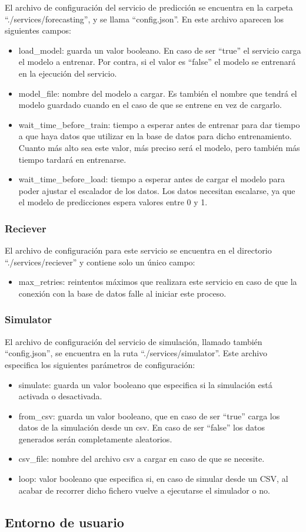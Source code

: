 El archivo de configuración del servicio de predicción se encuentra en la carpeta ``./services/forecasting'', y 
se llama ``config.json''. En este archivo aparecen los siguientes campos:
\begin{itemize}
    \item load\_model: guarda un valor booleano. En caso de ser ``true'' el servicio carga el modelo a entrenar.
        Por contra, si el valor es ``false'' el modelo se entrenará en la ejecución del servicio.
    \item model\_file: nombre del modelo a cargar. Es también el nombre que tendrá el modelo guardado cuando 
        en el caso de que se entrene en vez de cargarlo.
    \item wait\_time\_before\_train: tiempo a esperar antes de entrenar para dar tiempo a que haya datos que 
        utilizar en la base de datos para dicho entrenamiento. Cuanto más alto sea este valor, más preciso será 
        el modelo, pero también más tiempo tardará en entrenarse.
    \item wait\_time\_before\_load: tiempo a esperar antes de cargar el modelo para poder ajustar el escalador de los
        datos. Los datos necesitan escalarse, ya que el modelo de predicciones espera valores entre 0 y 1.
\end{itemize}

\subsubsection{Reciever}

El archivo de configuración para este servicio se encuentra en el directorio ``./services/reciever'' y 
contiene solo un único campo:
\begin{itemize}
    \item max\_retries: reintentos máximos que realizara este servicio en caso de que la conexión con 
        la base de datos falle al iniciar este proceso.
\end{itemize}

\subsubsection{Simulator}

El archivo de configuración del servicio de simulación, llamado también ``config.json'', se encuentra en la 
ruta ``./services/simulator''. Este archivo especifica los siguientes parámetros de configuración:
\begin{itemize}
  \item simulate: guarda un valor booleano que especifica si la simulación está activada o desactivada.
  \item from\_csv: guarda un valor booleano, que en caso de ser ``true'' carga los datos de la simulación desde
    un csv. En caso de ser ``false'' los datos generados serán completamente aleatorios.
  \item csv\_file: nombre del archivo csv a cargar en caso de que se necesite.
  \item loop: valor booleano que especifica si, en caso de simular desde un CSV, al acabar de recorrer dicho fichero 
    vuelve a ejecutarse el simulador o no.
\end{itemize}

\subsection{Entorno de usuario}

